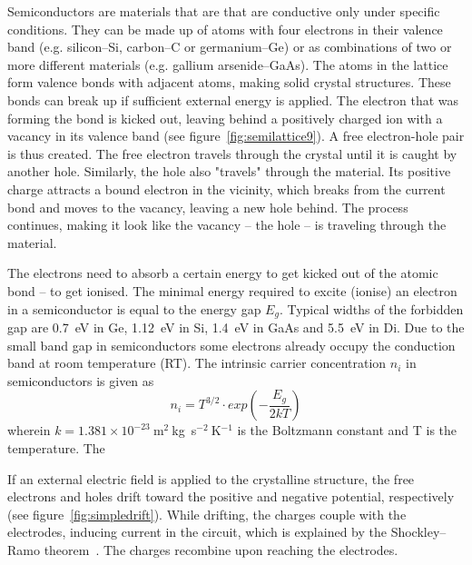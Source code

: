 \documentclass[twoside,12pt]{packages/mytustyle}  %
\begin{document}
Semiconductors are materials that are that are conductive only under specific conditions. They can be made up of atoms with four electrons in their valence band (e.g. silicon--Si, carbon--C or germanium--Ge) or as combinations of two or more different materials (e.g. gallium arsenide--GaAs). The atoms in the lattice form valence bonds with adjacent atoms, making solid crystal structures. These bonds can break up if sufficient external energy is applied. The electron that was forming the bond is kicked out, leaving behind a positively charged ion with a vacancy in its valence band (see figure~\ref{fig:semilattice9}). A free electron-hole pair is thus created. The free electron travels through the crystal until it is caught by another hole. Similarly, the hole also "travels" through the material. Its positive charge attracts a bound electron in the vicinity, which breaks from the current bond and moves to the vacancy, leaving a new hole behind. The process continues, making it look like the vacancy -- the hole -- is traveling through the material.




The electrons need to absorb a certain energy to get kicked out of the atomic bond -- to get ionised. The minimal energy required to excite (ionise) an electron in a semiconductor is equal to the energy gap $E_g$. Typical widths of the forbidden gap are 0.7~eV in Ge, 1.12~eV in Si, 1.4~eV in GaAs and 5.5~eV in Di. Due to the small band gap in semiconductors some electrons already occupy the conduction band at room temperature (RT). The intrinsic carrier concentration $n_i$ in semiconductors is given as
\begin{equation}
\label{eq:intrinsiccarrier}
n_i = T^{3/2} \cdot exp(-\frac{E_g}{2kT}) 
\end{equation} 
wherein $k = 1.381\times10^{-23}~$m$^2~$kg~s$^{-2}~$K$^{-1}$ is the Boltzmann constant and T is the temperature. The 

If an external electric field is applied to the crystalline structure, the free electrons and holes drift toward the positive and negative potential, respectively (see figure~\ref{fig:simpledrift}). While drifting, the charges couple with the electrodes, inducing current in the circuit, which is explained by the Shockley--Ramo theorem~\cite{}. The charges recombine upon reaching the electrodes.
\end{document}
